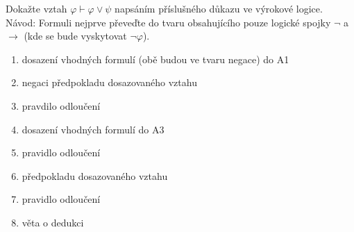 Dokažte vztah $\varphi \vdash \varphi \vee \psi$ napsáním příslušného důkazu ve
výrokové logice. Návod: Formuli nejprve převeďte do tvaru obsahujícího pouze
logické spojky $\neg$ a $\rightarrow$ (kde se bude vyskytovat $\neg \varphi$).
\begin{enumerate}[1)]
  \item dosazení vhodných formulí (obě budou ve tvaru negace) do A1
  \item negaci předpokladu dosazovaného vztahu
  \item pravdilo odloučení
  \item dosazení vhodných formulí do A3
  \item pravidlo odloučení
  \item předpokladu dosazovaného vztahu
  \item pravidlo odloučení
  \item věta o dedukci
\end{enumerate}
